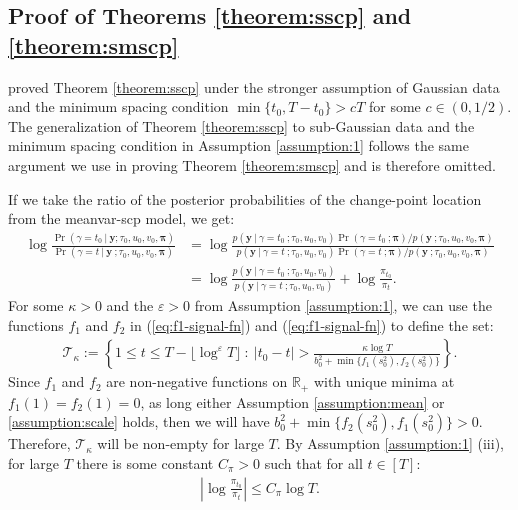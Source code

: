 \subsection{Proof of Theorems \ref{theorem:sscp} and \ref{theorem:smscp}}
\label{app:localization-smscp}

\cite{Cappello22} proved Theorem \ref{theorem:sscp} under the stronger assumption of Gaussian data and the minimum spacing condition $\min \{t_0, T-t_0\} > cT$ for some $c \in (0,1/2)$. The generalization of Theorem \ref{theorem:sscp} to sub-Gaussian data and the minimum spacing condition in Assumption \ref{assumption:1} follows the same argument we use in proving Theorem \ref{theorem:smscp} and is therefore omitted.

If we take the ratio of the posterior probabilities of the change-point location from the meanvar-scp model, we get:
\begin{align*}
    \log \frac{\Pr(\gamma = t_0  \:|\: \mathbf{y} ; \tau_0, u_0, v_0,\boldsymbol{\pi})}{\Pr(\gamma = t  \:|\: \mathbf{y} \:; \tau_0, u_0, v_0,\boldsymbol{\pi})} &=  \log \frac{p(\mathbf{y} \:|\:\gamma = t_0 \:; \tau_0, u_0, v_0)\Pr(\gamma = t_0 \:; \boldsymbol{\pi})/ p(\mathbf{y}\:;\tau_0, u_0, v_0,\boldsymbol{\pi})}{p(\mathbf{y} \:|\:\gamma = t \:; \tau_0, u_0, v_0)\Pr(\gamma = t \:;\boldsymbol{\pi})/ p(\mathbf{y}\:;\tau_0, u_0, v_0,\boldsymbol{\pi})} \tag{Bayes' rule} \\
    &= \log \frac{p(\mathbf{y} \:|\:\gamma = t_0 \:; \tau_0, u_0, v_0)}{p(\mathbf{y} \:|\:\gamma = t \:; \tau_0, u_0, v_0)} + \log\frac{\pi_{t_0}}{\pi_t}.
\end{align*}
For some $\kappa > 0$ and the $\varepsilon>0$ from Assumption \ref{assumption:1}, we can use the functions $f_1$ and $f_2$ in (\ref{eq:f1-signal-fn}) and (\ref{eq:f1-signal-fn}) to define the set:
\begin{align*}
    \mathcal{T}_{\kappa}:= \left\{1\leq t \leq T - \lfloor\log^{\varepsilon} T\rfloor\::\: |t_0 - t| > \frac{\kappa\log T}{b^2_0 + \min\{f_1(s_0^2),f_2(s_0^2)\}} \right\}.
\end{align*}
Since $f_1$ and $f_2$ are non-negative functions on $\mathbb{R}_+$ with unique minima at $f_1(1) = f_2(1) = 0$, as long either Assumption \ref{assumption:mean} or \ref{assumption:scale} holds, then we will have $b^2_0 + \min\{f_2(s_0^2),f_1(s_0^2)\}> 0$. Therefore, $\mathcal{T}_{\kappa}$ will be non-empty for large $T$. By Assumption \ref{assumption:1} (iii), for large $T$ there is some constant $C_\pi > 0$ such that for all $t \in [T]$: 
\begin{align}
    \left|\log \frac{\pi_{t_0}}{\pi_t}\right| \leq C_\pi \log T.
\end{align}
